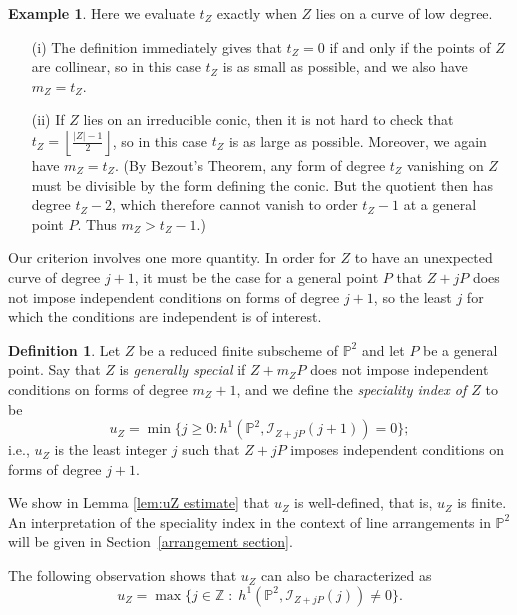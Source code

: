 \documentclass[12pt]{amsart}
\numberwithin{equation}{section}
\theoremstyle{definition}
\newtheorem{definition}[theorem]{Definition}
\newtheorem{example}[theorem]{Example}
\begin{document}
\begin{example}
   \label{rem:tZ}
Here we evaluate $t_Z$ exactly when $Z$ lies on a curve of low degree.
\begin{enumerate}
\item[(i)] The definition immediately gives that $t_Z = 0$ if and only if the points of $Z$ are collinear,
so in this case $t_Z$ is as small as possible, and we also have $m_Z=t_Z$.
\item[(ii)] If $Z$ lies on an irreducible conic, then  it is not hard to check that $t_Z = \left \lfloor \frac{|Z| -1}{2} \right \rfloor$,
so in this case $t_Z$ is as large as possible. Moreover, we again have $m_Z=t_Z$. (By Bezout's Theorem,
any form of degree $t_Z$ vanishing on $Z$ must be divisible by the form defining the conic. But the quotient
then has degree $t_Z-2$, which therefore cannot vanish to order $t_Z-1$ at a general point $P$. Thus $m_Z>t_Z-1$.)
\end{enumerate}
\end{example}

Our criterion involves one more quantity. In order for $Z$ to have an unexpected curve of degree $j+1$,
it must be the case for a general point $P$ that $Z+jP$ does not impose independent conditions on forms
of degree $j+1$, so the least $j$ for which the conditions are independent is of interest.

\begin{definition}\label{def:u_Z}
Let $Z$ be a reduced finite subscheme of ${ \ensuremath{\mathbb{P}}}^2$ and let $P$ be a general point.
Say that $Z$ is \emph{generally special} if $Z+m_ZP$ does 
not impose independent conditions on forms of degree $m_Z+1$, and we define the \emph{speciality index of $Z$} to be 
\[
u_Z = \min \{ j \geq 0 :  h^1({ \ensuremath{\mathbb{P}}}^2,\mathcal I_{Z+jP}(j+1))=0 \} ;
\]
i.e., $u_Z$ is the least integer $j$ such that $Z+jP$ imposes independent conditions on forms of degree $j+1$.
\end{definition}

We show in Lemma \ref{lem:uZ estimate} that $u_Z$ is well-defined, that is, $u_Z$ is finite. 
An interpretation of the speciality index in the context of line arrangements in $\mathbb P^2$   
will be given in Section~\ref{arrangement section}. 

The following observation shows that $u_Z$ can also be characterized as 
\[
u_Z = \max \{j \in { \ensuremath{\mathbb{Z}}} \; : \; h^1({ \ensuremath{\mathbb{P}}}^2,\mathcal I_{Z+jP}(j)) \neq 0 \}. 
\]
 
\end{document}
